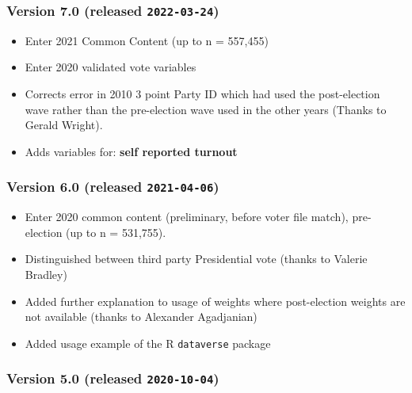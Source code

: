 \documentclass[10pt,article,oneside]{memoir}
\theoremstyle{definition}
\begin{document}
\subsubsection{\texorpdfstring{Version 7.0 (released
\texttt{2022-03-24})}{Version 7.0 (released 2022-03-24)}}\label{version-7.0-released-2022-03-24}

\begin{itemize}
\tightlist
\item
  Enter 2021 Common Content (up to n = 557,455)
\item
  Enter 2020 validated vote variables
\item
  Corrects error in 2010 3 point Party ID which had used the
  post-election wave rather than the pre-election wave used in the other
  years (Thanks to Gerald Wright).
\item
  Adds variables for: \textbf{self reported turnout}
\end{itemize}

\subsubsection{\texorpdfstring{Version 6.0 (released
\texttt{2021-04-06})}{Version 6.0 (released 2021-04-06)}}\label{version-6.0-released-2021-04-06}

\begin{itemize}
\tightlist
\item
  Enter 2020 common content (preliminary, before voter file match),
  pre-election (up to n = 531,755).
\item
  Distinguished between third party Presidential vote (thanks to Valerie
  Bradley)
\item
  Added further explanation to usage of weights where post-election
  weights are not available (thanks to Alexander Agadjanian)
\item
  Added usage example of the R \texttt{dataverse} package
\end{itemize}

\subsubsection{\texorpdfstring{Version 5.0 (released
\texttt{2020-10-04})}{Version 5.0 (released 2020-10-04)}}\label{version-5.0-released-2020-10-04}
\end{document}
